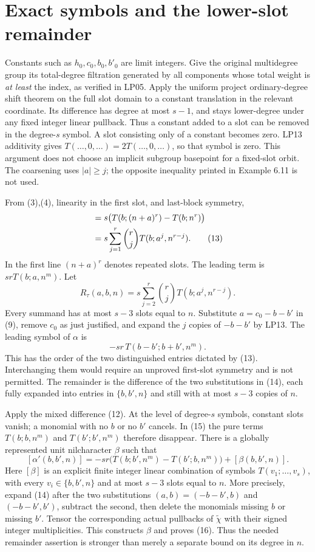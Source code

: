 \documentclass[11pt]{article}
\begin{document}
\section{Exact symbols and the lower-slot remainder}\label{sec:algebra}
Constants such as $h_0,c_0,b_0,b'_0$ are limit integers. Give the original
multidegree group its total-degree filtration generated by all components
whose total weight is \emph{at least} the index, as verified in LP05.
Apply the uniform project ordinary-degree shift theorem on the full slot
domain to a constant translation in the relevant coordinate. Its difference
has degree at most $s-1$, and stays lower-degree under any fixed integer
linear pullback. Thus a constant added to a slot can be removed in the
degree-$s$ symbol. A slot consisting only of a constant becomes zero.
LP13 additivity gives $T(\ldots,0,\ldots)=2T(\ldots,0,\ldots)$, so that
symbol is zero. This argument does not choose an implicit subgroup
basepoint for a fixed-slot orbit. The coarsening uses $|a|\geq j$;
the opposite inequality printed in Example 6.11 is not used.

From (3),(4), linearity in the first slot, and last-block symmetry,
\begin{align}
 [\tau(a,b,n)]
 &=s\bigl(T(b;(n+a)^r)-T(b;n^r)\bigr)\notag\\
 &=s\sum_{j=1}^r {r\choose j}T(b;a^j,n^{r-j}).           \tag{13}
\end{align}
In the first line $(n+a)^r$ denotes repeated slots.
The leading term is $srT(b;a,n^m)$. Let
\[
 R_\tau(a,b,n)=s\sum_{j=2}^r {r\choose j}T(b;a^j,n^{r-j}). \tag{14}
\]
Every summand has at most $s-3$ slots equal to $n$.
Substitute $a=c_0-b-b'$ in (9), remove $c_0$ as just justified, and
expand the $j$ copies of $-b-b'$ by LP13. The leading symbol of $\alpha$ is
\[
 -sr\,T(b-b';b+b',n^m).                                \tag{15}
\]
This has the order of the two distinguished entries dictated by (13).
Interchanging them would require an unproved first-slot symmetry and is
not permitted. The remainder is the difference of the two substitutions
in (14), each fully expanded into entries in $\{b,b',n\}$ and still with
at most $s-3$ copies of $n$.

Apply the mixed difference (12). At the level of degree-$s$ symbols,
constant slots vanish; a monomial with no $b$ or no $b'$ cancels.
In (15) the pure terms $T(b;b,n^m)$ and $T(b';b',n^m)$ therefore disappear.
There is a globally represented unit nilcharacter $\beta$ such that
\[
 [\alpha'(b,b',n)]=-sr\bigl(T(b;b',n^m)-T(b';b,n^m)\bigr)+[\beta(b,b',n)].
                                                               \tag{16}
\]
Here $[\beta]$ is an explicit finite integer linear combination of symbols
$T(v_1;\ldots,v_s)$, with every $v_i\in\{b,b',n\}$ and at most $s-3$
slots equal to $n$. More precisely, expand (14) after the two substitutions
$(a,b)=(-b-b',b)$ and $(-b-b',b')$, subtract the second, then delete the
monomials missing $b$ or missing $b'$. Tensor the corresponding actual
pullbacks of $\widetilde\chi$ with their signed integer multiplicities.
This constructs $\beta$ and proves (16). Thus the needed remainder
assertion is stronger than merely a separate bound on its degree in $n$.
\end{document}
